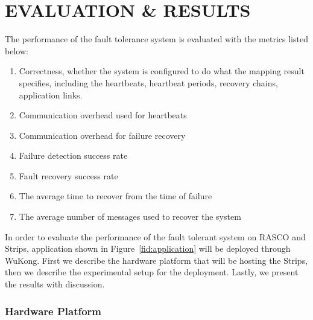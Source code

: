 \cleardoublepage
\singlespacing
\chapter{EVALUATION \& RESULTS}
\label{c:evaluation}
\doublespacing\nointerlineskip



The performance of the fault tolerance system is evaluated with the metrics listed below:
\begin{enumerate}
\item Correctness, whether the system is configured to do what the mapping result specifies, including the heartbeats, heartbeat periods, recovery chains, application links.
\item Communication overhead used for heartbeats
\item Communication overhead for failure recovery
\item Failure detection success rate
\item Fault recovery success rate
\item The average time to recover from the time of failure
\item The average number of messages used to recover the system
\end{enumerate}

In order to evaluate the performance of the fault tolerant system on RASCO and Strips, application shown in Figure~\ref{fid:application} will be deployed through WuKong. First we describe the hardware platform that will be hosting the Strips, then we describe the experimental setup for the deployment. Lastly, we present the results with discussion.

\subsection{Hardware Platform}

